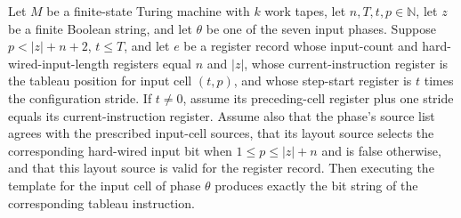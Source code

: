 \begin{theorem}
\label{Complexity.UTab.inp_bits}
\leanok
{}
Let $M$ be a finite-state Turing machine with $k$ work tapes, let $n,T,t,p\in\mathbb N$,
let $z$ be a finite Boolean string, and let $\theta$ be one of the seven input phases.
Suppose $p<|z|+n+2$, $t\le T$, and let $e$ be a register record whose input-count and
hard-wired-input-length registers equal $n$ and $|z|$, whose current-instruction
register is the tableau position for input cell $(t,p)$, and whose step-start register
is $t$ times the configuration stride. If $t\ne0$, assume its preceding-cell register
plus one stride equals its current-instruction register. Assume also that the phase’s
source list agrees with the prescribed input-cell sources, that its layout source
selects the corresponding hard-wired input bit when $1\le p\le |z|+n$ and is false
otherwise, and that this layout source is valid for the register record. Then executing
the template for the input cell of phase $\theta$ produces exactly the bit string of the
corresponding tableau instruction.
\end{theorem}

